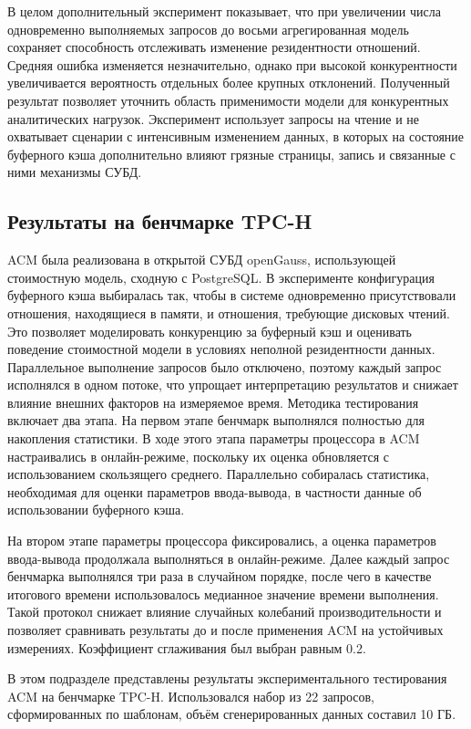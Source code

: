 В целом дополнительный эксперимент показывает, что при увеличении числа одновременно выполняемых запросов до восьми агрегированная модель сохраняет способность отслеживать изменение резидентности отношений. Средняя ошибка изменяется незначительно, однако при высокой конкурентности увеличивается вероятность отдельных более крупных отклонений. Полученный результат позволяет уточнить область применимости модели для конкурентных аналитических нагрузок. Эксперимент использует запросы на чтение и не охватывает сценарии с интенсивным изменением данных, в которых на состояние буферного кэша дополнительно влияют грязные страницы, запись и связанные с ними механизмы СУБД.

\subsection{Результаты на бенчмарке TPC-H}

ACM была реализована в открытой СУБД openGauss, использующей стоимостную модель, сходную с PostgreSQL. В эксперименте конфигурация буферного кэша выбиралась так, чтобы в системе одновременно присутствовали отношения, находящиеся в памяти, и отношения, требующие дисковых чтений. Это позволяет моделировать конкуренцию за буферный кэш и оценивать поведение стоимостной модели в условиях неполной резидентности данных. Параллельное выполнение запросов было отключено, поэтому каждый запрос исполнялся в одном потоке, что упрощает интерпретацию результатов и снижает влияние внешних факторов на измеряемое время. Методика тестирования включает два этапа. На первом этапе бенчмарк выполнялся полностью для накопления статистики. В ходе этого этапа параметры процессора в ACM настраивались в онлайн-режиме, поскольку их оценка обновляется с использованием скользящего среднего. Параллельно собиралась статистика, необходимая для оценки параметров ввода-вывода, в частности данные об использовании буферного кэша.

На втором этапе параметры процессора фиксировались, а оценка параметров ввода-вывода продолжала выполняться в онлайн-режиме. Далее каждый запрос бенчмарка выполнялся три раза в случайном порядке, после чего в качестве итогового времени использовалось медианное значение времени выполнения. Такой протокол снижает влияние случайных колебаний производительности и позволяет сравнивать результаты до и после применения ACM на устойчивых измерениях. Коэффициент сглаживания был выбран равным 0.2. 

В этом подразделе представлены результаты экспериментального тестирования ACM на бенчмарке TPC-H. Использовался набор из 22 запросов, сформированных по шаблонам, объём сгенерированных данных составил 10 ГБ.

